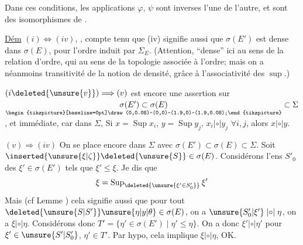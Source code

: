 

Dans ces conditions, les applications $\varphi$, $\psi$ sont inverses l'une de l'autre, et sont des isomorphismes de .

\uline{Dém} $(i)\Longleftrightarrow(iv)$, , compte tenu que (iv) signifie aussi que $\sigma(E')$ est dense dans $\sigma(E)$, pour l'ordre induit par $\Sigma_E$. (Attention, ``dense'' ici au sens de la relation d'ordre, qui     au sens de la topologie associée à l'ordre; mais on a néanmoins transitivité de la notion de densité, grâce à l'associativité des $\sup$.)

$(i\deleted{\unsure{v}})\Longrightarrow(v)$ est encore une assertion sur $\underset{\begin{tikzpicture}[baseline=0pt]\draw (0,0.08)--(0,0)--(1.9,0)--(1.9,0.08);\end{tikzpicture}}{\sigma(E')\subset\sigma(E)}\subset\Sigma$, et immédiate, car dans $\Sigma$,  Si $x=\operatorname{Sup}x_i$, $y=\operatorname{Sup}y_j$, $x_i\mathrel{|{\circ}|}y_j$ $\forall i,j$, alors $x\mathrel{|{\circ}|}y$.

$(v)\Longrightarrow(iv)$  On se place encore dans $\Sigma$ avec $\sigma(E')\subset\sigma(E)\subset\Sigma$. Soit  $\inserted{\unsure{\xi|\zeta}}\deleted{\unsure{S}}\in\sigma(E)$.  Considérons l'ens $S'_0$ des $\xi'\in\sigma(E')$ tels que $\xi'\leq\xi$. Je dis que
\[
\xi=\operatorname{Sup}_{\deleted{\unsure{\xi'\in S'_0}}}\xi'
\]
Mais (cf Lemme ) cela signifie aussi que pour tout $\deleted{\unsure{S|S'}}\unsure{\eta|y|\theta}\in\sigma(E)$, on a $\unsure{S'_0|\xi'}\mathrel{|{\circ}|}\eta$, on a $\xi\mathrel{|{\circ}|}\eta$. Considérons donc $T'=\{\eta'\in\sigma(E')\mid\eta'\leq\eta\}$. On a donc $\xi'\mathrel{|{\circ}|}\eta'$ pour $\xi'\in\unsure{S'|S'_0}$, $\eta'\in T'$. Par hypo, cela implique $\xi\mathrel{|{\circ}|}\eta$, OK.
